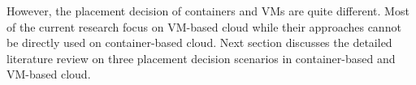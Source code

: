   However, the placement decision of containers and VMs are quite different.
Most of the current research focus on VM-based cloud while their approaches cannot be directly used on container-based cloud. Next section discusses the detailed literature review on three placement decision scenarios in container-based and VM-based cloud.










